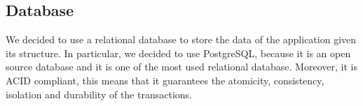 \subsection{Database}
We decided to use a relational database to store the data of the application given its structure. In particular, we decided to use PostgreSQL, because it is an open source database and it is one of the most used relational database. Moreover, it is ACID compliant, this means that it guarantees the atomicity, consistency, isolation and durability of the transactions.